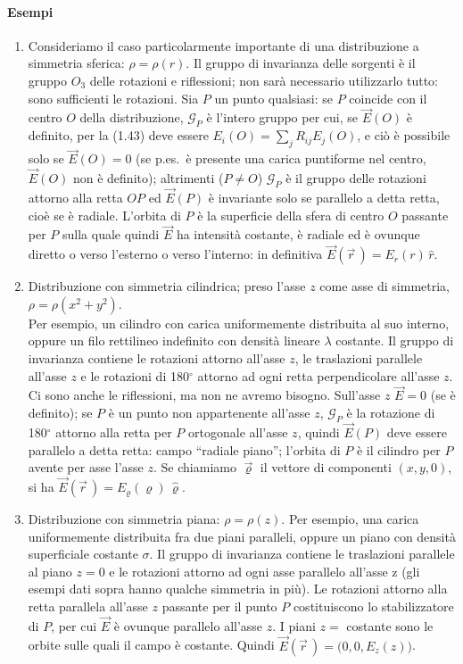 \paragraph{Esempi}
\begin{enumerate}
\item Consideriamo il caso particolarmente importante di una distribuzione a simmetria sferica: $\rho=\rho(r)$. Il gruppo di invarianza delle sorgenti è il gruppo $O_3$ delle rotazioni e riflessioni; non sarà necessario utilizzarlo tutto: sono sufficienti le rotazioni. Sia $P$ un punto qualsiasi: se $P$ coincide con il centro $O$ della distribuzione, $\mathcal G_P$ è l'intero gruppo per cui, se $\vec E(O)$ è definito, per la (1.43) deve essere $E_i(O)=\sum_jR_{ij}E_j(O)$, e ciò è possibile solo se $\vec E(O)=0$ (se p.es.\ è presente una carica puntiforme nel centro, $\vec E(O)$ non è definito); altrimenti ($P\neq O$) $\mathcal G_P$ è il gruppo delle rotazioni attorno alla retta $OP$ ed $\vec E(P)$ è invariante solo se parallelo a detta retta, cioè se è radiale. L'orbita di $P$ è la superficie della sfera di centro $O$
passante per $P$ sulla quale quindi $\vec E$ ha intensità costante, è radiale ed è ovunque diretto o verso l'esterno o verso l'interno: in definitiva $\vec E(\vec r\,)=E_r(r)\,\hat r$.
\item Distribuzione con simmetria cilindrica; preso l'asse $z$ come asse di simmetria, $\rho=\rho(x^2+y^2)$.\\
Per esempio, un cilindro con carica uniformemente distribuita al suo interno, oppure un filo rettilineo indefinito con densità lineare $\lambda$ costante. Il gruppo di invarianza contiene le rotazioni attorno all'asse $z$, le traslazioni parallele all'asse $z$ e le rotazioni di 180$^\circ$ attorno ad ogni retta perpendicolare all'asse $z$. Ci sono anche le riflessioni, ma non ne avremo bisogno. Sull'asse $z$ $\vec E=0$ (se è definito); se $P$ è un punto non appartenente all'asse $z$, $\mathcal G_P$ è la rotazione di 180$^\circ$ attorno alla retta per $P$ ortogonale all'asse $z$, quindi $\vec E(P)$ deve essere parallelo a detta retta: campo ``radiale piano''; l'orbita di $P$ è il cilindro per $P$ avente per asse l'asse $z$. Se chiamiamo $\vec\varrho$ il vettore di componenti $(x,y,0)$, si ha $\vec E(\vec r\,)=E_\varrho(\varrho)\,\hat\varrho$.
\item Distribuzione con simmetria piana: $\rho=\rho(z)$. Per esempio, una carica uniformemente distribuita fra due piani paralleli, oppure un piano con densità superficiale costante $\sigma$. Il gruppo di invarianza contiene le traslazioni parallele al piano $z=0$ e le rotazioni attorno ad ogni asse parallelo all'asse z (gli esempi dati sopra hanno qualche simmetria in più). Le rotazioni attorno alla retta parallela all'asse $z$ passante per il punto $P$ costituiscono lo stabilizzatore di $P$, per cui $\vec E$ è ovunque parallelo all'asse $z$. I piani $z=$ costante sono le orbite sulle quali il campo è costante. Quindi $\vec E(\vec r\,)=\big(0,0,E_z(z)\big)$.
\end{enumerate}
